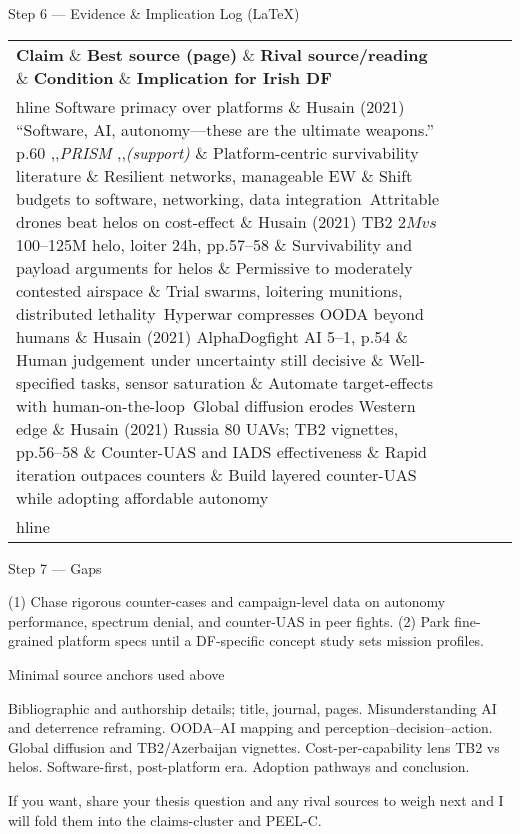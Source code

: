 Step 6 — Evidence \& Implication Log (LaTeX)

 

\begin{tabular}{p{3.2cm}p{4.2cm}p{3.6cm}p{3.2cm}p{4.2cm}}
	\textbf{Claim} \& \textbf{Best source (page)} \& \textbf{Rival source/reading} \& \textbf{Condition} \& \textbf{Implication for Irish DF}\\hline
	Software primacy over platforms \& Husain (2021) “Software, AI, autonomy—these are the ultimate weapons.” p.60 ,,\textit{PRISM} ,,\footnotesize{\textit{(support)}} \& Platform-centric survivability literature \& Resilient networks, manageable EW \& Shift budgets to software, networking, data integration\
	Attritable drones beat helos on cost-effect \& Husain (2021) TB2 $2M vs $100–125M helo, loiter 24h, pp.57–58 \& Survivability and payload arguments for helos \& Permissive to moderately contested airspace \& Trial swarms, loitering munitions, distributed lethality\
	Hyperwar compresses OODA beyond humans \& Husain (2021) AlphaDogfight AI 5–1, p.54 \& Human judgement under uncertainty still decisive \& Well-specified tasks, sensor saturation \& Automate target-effects with human-on-the-loop\
	Global diffusion erodes Western edge \& Husain (2021) Russia 80 UAVs; TB2 vignettes, pp.56–58 \& Counter-UAS and IADS effectiveness \& Rapid iteration outpaces counters \& Build layered counter-UAS while adopting affordable autonomy\\hline
\end{tabular}

Step 7 — Gaps

(1) Chase rigorous counter-cases and campaign-level data on autonomy performance, spectrum denial, and counter-UAS in peer fights.
(2) Park fine-grained platform specs until a DF-specific concept study sets mission profiles.

Minimal source anchors used above

Bibliographic and authorship details; title, journal, pages.
Misunderstanding AI and deterrence reframing.
OODA–AI mapping and perception–decision–action.
Global diffusion and TB2/Azerbaijan vignettes.
Cost-per-capability lens TB2 vs helos.
Software-first, post-platform era.
Adoption pathways and conclusion.

If you want, share your thesis question and any rival sources to weigh next and I will fold them into the claims-cluster and PEEL-C.

\parencite{KREPINEVICH_2002}

